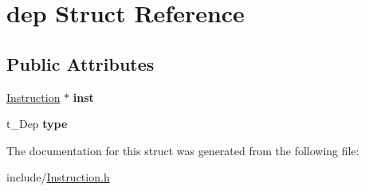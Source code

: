 \hypertarget{structdep}{}\section{dep Struct Reference}
\label{structdep}
\subsection*{Public Attributes}
\begin{DoxyCompactItemize}
\item 
\mbox{\label{structdep_a9e96f97584305769326e51a9e63e2a30}} 
\mbox{\hyperlink{class_instruction}{Instruction}} $\ast$ {\bfseries inst}
\item 
\mbox{\label{structdep_a7484e3ca60b5a8fa74291aa4031a285e}} 
t\+\_\+\+Dep {\bfseries type}
\end{DoxyCompactItemize}


The documentation for this struct was generated from the following file\+:\begin{DoxyCompactItemize}
\item 
include/\mbox{\hyperlink{_instruction_8h}{Instruction.\+h}}\end{DoxyCompactItemize}
